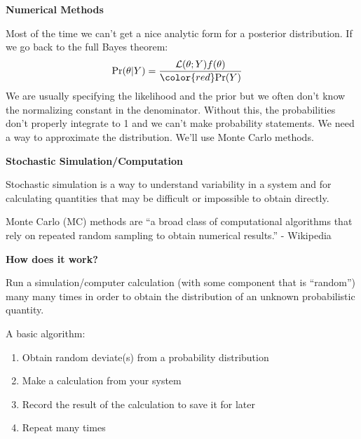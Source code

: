 \documentclass[12pt,xcolor=svgnames]{beamer}
\newcommand{\rd}{\color{red}}
\newcommand{\theme}{\color{FireBrick}}
\newcommand{\fb}{\color{FireBrick}}
\newcommand{\sk}{\vspace{.4cm}}
\newcommand{\nochap}{\vspace{0.5cm}}
\newcommand{\chap}[1]{{\theme \Large \bf #1} \sk}
\begin{document}
\begin{frame}
\chap{Numerical Methods}

Most of the time we can't get a nice analytic form for a posterior distribution. If we go back to the full Bayes theorem:
\begin{align*}
\text{Pr}(\theta|Y) & = \frac{\mathcal{L}(\theta; Y)f(\theta)}{{\rd \text{Pr}(Y)}}
\end{align*}
We are usually specifying the likelihood and the prior but we often don't know the normalizing constant in the denominator. Without this, the probabilities don't properly integrate to 1 and we {\rd can't make probability statements}. We need a way to approximate the distribution. We'll use Monte Carlo methods.\\
\end{frame}



\begin{frame}
\chap{Stochastic Simulation/Computation}

Stochastic simulation is a way to understand variability in a system and for calculating quantities that may be difficult or impossible to obtain directly.\\

\sk

Monte Carlo (MC) methods are ``a broad class of computational algorithms that rely on {\rd repeated random sampling} to obtain numerical results.'' - Wikipedia\\



\end{frame}


\begin{frame}
\nochap%

{\fb \bf How does it work?}

\sk
Run a simulation/computer calculation (with some component that is ``random'') many many times in order to obtain the distribution of an unknown probabilistic quantity.

\bigskip

A basic algorithm: 
\begin{enumerate}
\item Obtain random deviate(s) from a probability distribution
\item Make a calculation from your system
\item Record the result of the calculation to save it for later
\item Repeat many times
\end{enumerate}

\vfill

\end{frame}
\end{document}

